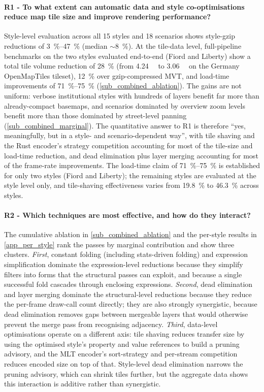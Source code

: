 \paragraph{R1 - To what extent can automatic data and style co-optimisations reduce map tile size and improve rendering performance?}
Style-level evaluation across all 15 styles and 18 scenarios shows style-gzip reductions of \qtyrange{3}{47}{\percent} (median ${\sim}$\qty{8}{\percent}).
At the tile-data level, full-pipeline benchmarks on the two styles evaluated end-to-end (Fiord and Liberty) show a total tile volume reduction of \qty{28}{\percent} (from \qty{4.24}{\giga\byte} to \qty{3.06}{\giga\byte} on the Germany OpenMapTiles tileset), \qty{12}{\percent} over gzip-compressed \ac{MVT}, and load-time improvements of \qtyrange{71}{75}{\percent} (\cref{sub_combined_ablation}).
The gains are not uniform: verbose institutional styles with hundreds of layers benefit far more than already-compact basemaps, and scenarios dominated by overview zoom levels benefit more than those dominated by street-level panning (\cref{sub_combined_marginal}).
The quantitative answer to R1 is therefore \enquote{yes, meaningfully, but in a style- and scenario-dependent way}, with tile shaving and the Rust encoder's strategy competition accounting for most of the tile-size and load-time reduction, and dead elimination plus layer merging accounting for most of the frame-rate improvements.  The load-time claim of \qtyrange{71}{75}{\percent} is established for only two styles (Fiord and Liberty); the remaining styles are evaluated at the style level only, and tile-shaving effectiveness varies from \qty{19.8}{\percent} to \qty{46.3}{\percent} across styles.

\paragraph{R2 - Which techniques are most effective, and how do they interact?}
The cumulative ablation in \cref{sub_combined_ablation} and the per-style results in \cref{app_per_style} rank the passes by marginal contribution and show three clusters.
\emph{First}, constant folding (including stats-driven folding) and expression simplification dominate the expression-level reductions because they simplify filters into forms that the structural passes can exploit, and because a single successful fold cascades through enclosing expressions.
\emph{Second}, dead elimination and layer merging dominate the structural-level reductions because they reduce the per-frame draw-call count directly; they are also strongly synergistic, because dead elimination removes gaps between mergeable layers that would otherwise prevent the merge pass from recognising adjacency.
\emph{Third}, data-level optimisations operate on a different axis: tile shaving reduces transfer size by using the optimised style's property and value references to build a pruning advisory, and the \ac{MLT} encoder's sort-strategy and per-stream competition reduces encoded size on top of that.
Style-level dead elimination narrows the pruning advisory, which can shrink tiles further, but the aggregate data shows this interaction is additive rather than synergistic.

